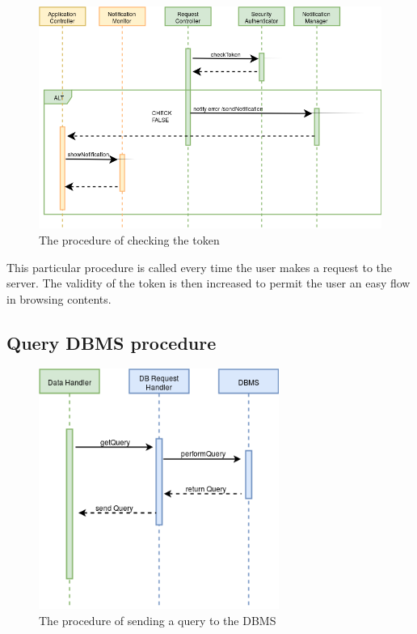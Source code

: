 \documentclass[numbers=noenddot, 12pt, a4paper, oneside]{scrbook}
\begin{document}
\begin{figure}[H]
	\centering
	\includegraphics[width=1.1\textwidth,angle=-0]{images/checkToken}
	\caption{The procedure of checking the token}
\end{figure}

This particular procedure is called every time the user makes a request to the server. The validity of the token is then increased to permit the user an easy flow in browsing contents.

\subsection*{Query DBMS procedure}

\begin{figure}[H]
	\centering
	\includegraphics[width=0.7\textwidth,angle=-0]{images/QueryDBMS}
	\caption{The procedure of sending a query to the DBMS}
\end{figure}
\end{document}
